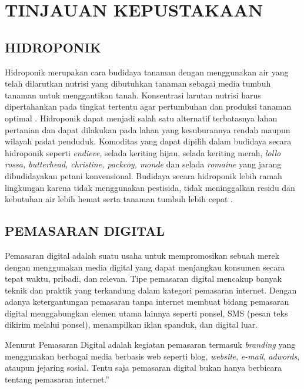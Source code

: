 \fancyhf{} 
\fancyfoot[C]{\thepage}
\chapter{TINJAUAN KEPUSTAKAAN}               

\section{\uppercase{Hidroponik}}
Hidroponik merupakan cara budidaya tanaman dengan menggunakan air yang telah dilarutkan nutrisi yang dibutuhkan tanaman sebagai media tumbuh tanaman untuk menggantikan tanah. Konsentrasi larutan nutrisi harus dipertahankan pada tingkat tertentu agar pertumbuhan dan produksi tanaman optimal \citep{istiqomah2006menanam}. Hidroponik dapat menjadi salah satu alternatif terbatasnya lahan pertanian dan dapat dilakukan pada lahan yang kesuburannya rendah maupun wilayah padat penduduk. Komoditas yang dapat dipilih dalam budidaya secara hidroponik seperti \textit{endieve}, selada keriting hijau, selada keriting merah, \textit{lollo rossa, butterhead, christine, packcoy, monde} dan selada \textit{romaine} yang jarang dibudidayakan petani konvensional. Budidaya secara hidroponik lebih ramah lingkungan karena tidak menggunakan pestisida, tidak meninggalkan residu dan kebutuhan air lebih hemat serta tanaman tumbuh lebih cepat \citep{herwibowo2014hidroponik}.

\section{\uppercase{Pemasaran Digital}}
Pemasaran digital adalah suatu usaha untuk mempromosikan sebuah merek dengan menggunakan media digital yang dapat menjangkau konsumen secara tepat waktu, pribadi, dan relevan. Tipe pemasaran digital mencakup banyak teknik dan praktik yang terkandung dalam kategori pemasaran internet. Dengan adanya ketergantungan pemasaran tanpa internet membuat bidang pemasaran digital menggabungkan elemen utama lainnya seperti ponsel, SMS (pesan teks dikirim melalui ponsel), menampilkan iklan spanduk, dan digital luar. \citep{wikipedia2021}

\par Menurut \cite{tarigan2013creative} Pemasaran Digital adalah kegiatan pemasaran termasuk \textit{branding} yang menggunakan berbagai media berbasis web seperti blog, \textit{website}, \textit{e-mail}, \textit{adwords}, ataupun jejaring sosial. Tentu saja pemasaran digital bukan hanya berbicara tentang pemasaran internet.”

